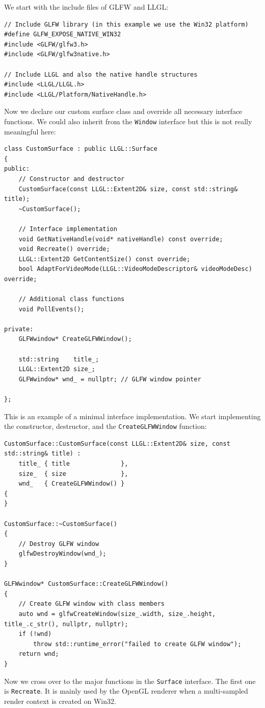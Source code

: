 \documentclass{article}
\begin{document}
We start with the include files of GLFW and LLGL:
\begin{lstlisting}
// Include GLFW library (in this example we use the Win32 platform)
#define GLFW_EXPOSE_NATIVE_WIN32
#include <GLFW/glfw3.h>
#include <GLFW/glfw3native.h>

// Include LLGL and also the native handle structures
#include <LLGL/LLGL.h>
#include <LLGL/Platform/NativeHandle.h>
\end{lstlisting}
Now we declare our custom surface class and override all necessary interface functions.
We could also inherit from the \texttt{Window} interface but this is not really meaningful here:
\begin{lstlisting}
class CustomSurface : public LLGL::Surface
{
public:
	// Constructor and destructor
	CustomSurface(const LLGL::Extent2D& size, const std::string& title);
	~CustomSurface();
	
	// Interface implementation
	void GetNativeHandle(void* nativeHandle) const override;
	void Recreate() override;
	LLGL::Extent2D GetContentSize() const override;
	bool AdaptForVideoMode(LLGL::VideoModeDescriptor& videoModeDesc) override;
	
	// Additional class functions
	void PollEvents();
	
private:
	GLFWwindow* CreateGLFWWindow();
	
	std::string    title_;
	LLGL::Extent2D size_;
	GLFWwindow* wnd_ = nullptr; // GLFW window pointer
	
};
\end{lstlisting}
This is an example of a minimal interface implementation.
We start implementing the constructor, destructor, and the \texttt{CreateGLFWWindow} function:
\begin{lstlisting}
CustomSurface::CustomSurface(const LLGL::Extent2D& size, const std::string& title) :
	title_ { title              },
	size_  { size               },
	wnd_   { CreateGLFWWindow() }
{
}

CustomSurface::~CustomSurface()
{
	// Destroy GLFW window
	glfwDestroyWindow(wnd_);
}

GLFWwindow* CustomSurface::CreateGLFWWindow()
{
	// Create GLFW window with class members
	auto wnd = glfwCreateWindow(size_.width, size_.height, title_.c_str(), nullptr, nullptr);
	if (!wnd)
		throw std::runtime_error("failed to create GLFW window");
	return wnd;
}
\end{lstlisting}
Now we cross over to the major functions in the \texttt{Surface} interface. The first one is \texttt{Recreate}.
It is mainly used by the OpenGL renderer when a multi-sampled render context is created on Win32.
\end{document}
